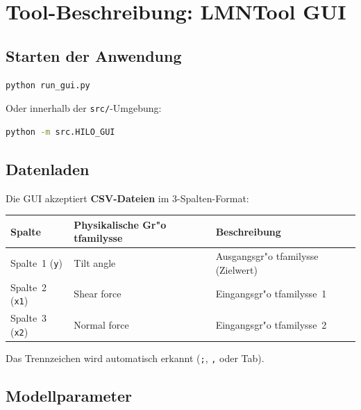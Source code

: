 \documentclass[12pt,a4paper]{article}
\begin{document}
\section{Tool-Beschreibung: LMNTool GUI}

\subsection{Starten der Anwendung}

\begin{lstlisting}[language=bash,caption={GUI starten}]
python run_gui.py
\end{lstlisting}

Oder innerhalb der \texttt{src/}-Umgebung:

\begin{lstlisting}[language=bash]
python -m src.HILO_GUI
\end{lstlisting}

\subsection{Datenladen}

Die GUI akzeptiert \textbf{CSV-Dateien} im 3-Spalten-Format:

\begin{center}
\begin{tabular}{lll}
  \toprule
  \textbf{Spalte} & \textbf{Physikalische Gr"o	tfamily{sse}} & \textbf{Beschreibung} \\
  \midrule
  Spalte~1 (\texttt{y}) & Tilt angle & Ausgangsgr"o	tfamily{sse (Zielwert)} \\
  Spalte~2 (\texttt{x1}) & Shear force & Eingangsgr"o	tfamily{sse~1} \\
  Spalte~3 (\texttt{x2}) & Normal force & Eingangsgr"o	tfamily{sse~2} \\
  \bottomrule
\end{tabular}
\end{center}

Das Trennzeichen wird automatisch erkannt (\texttt{;}, \texttt{,} oder Tab).

\subsection{Modellparameter}
\end{document}
